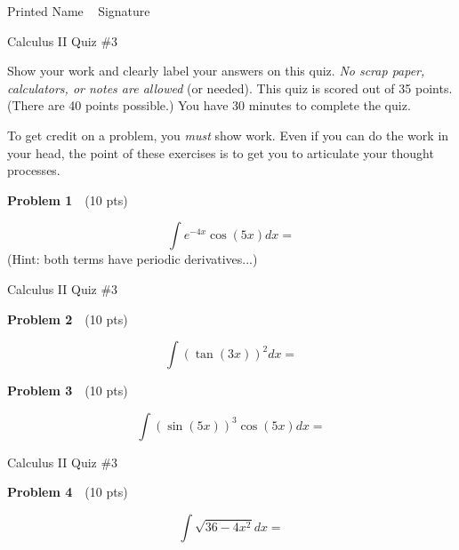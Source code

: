 \documentclass[10pt]{article}
\newcommand{\prob}[1]{\vspace{10mm} \noindent \textbf{Problem #1} \,\,}
\newcommand{\header}{
\begin{center}
Calculus II Quiz \#3
\end{center}

\vspace{2mm}

}
\newcommand{\namefield}{
\noindent Printed Name \underline{\hspace{50mm}} \,\,\, Signature \underline{\hspace{50mm}}
}
\newcommand{\inst}[2]{
Show your work and clearly label your answers on this quiz. \emph{No scrap paper, calculators, or notes are allowed} (or needed). This quiz is scored out of #1 points. (There are #2 points possible.) You have 30 minutes to complete the quiz.

To get credit on a problem, you \emph{must} show work. Even if you can do the work in your head, the point of these exercises is to get you to articulate your thought processes.
}
\begin{document}


\namefield

\header

\inst{35}{40}


\prob{1} (10 pts) %




\[ \int e^{-4x} \cos(5x) dx =  \]
(Hint: both terms have periodic derivatives...)

\pagebreak

\header

\prob{2} (10 pts) %

\[ \int (\tan(3x))^2 dx =  \]


\vspace{65mm} 

\prob{3} (10 pts) %

\[ \int (\sin(5x))^3 \cos(5x) dx =  \]


\pagebreak

\header

\prob{4} (10 pts) %

\[ \int \sqrt{36 - 4x^2} dx =  \]



\end{document}
